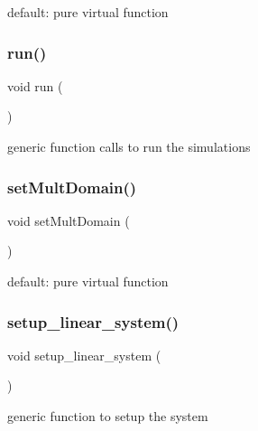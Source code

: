 default\+: pure virtual function \mbox{\label{classmechano_chem_f_e_m_a13a43e6d814de94978c515cb084873b1}} 
\subsubsection{\texorpdfstring{run()}{run()}}
{\footnotesize\ttfamily void run (\begin{DoxyParamCaption}{ }\end{DoxyParamCaption})\hspace{0.3cm}{\ttfamily [virtual]}}

generic function calls to run the simulations \mbox{\label{classmechano_chem_f_e_m_a5fb25d0981afa1f7d87875fffcc272c1}} 
\subsubsection{\texorpdfstring{setMultDomain()}{setMultDomain()}}
{\footnotesize\ttfamily void set\+Mult\+Domain (\begin{DoxyParamCaption}{ }\end{DoxyParamCaption})\hspace{0.3cm}{\ttfamily [virtual]}}

default\+: pure virtual function \mbox{\label{classmechano_chem_f_e_m_a082302fff160a5e5535e6647af388389}} 
\subsubsection{\texorpdfstring{setup\_linear\_system()}{setup\_linear\_system()}}
{\footnotesize\ttfamily void setup\+\_\+linear\+\_\+system (\begin{DoxyParamCaption}{ }\end{DoxyParamCaption})\hspace{0.3cm}{\ttfamily [virtual]}}

generic function to setup the system \mbox{\label{classmechano_chem_f_e_m_a856108deee592fc9dde678b60a9b6596}} 
